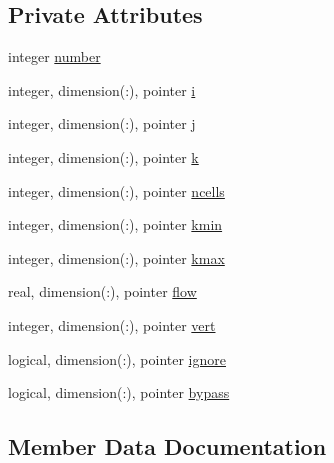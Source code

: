 \subsection*{Private Attributes}
\begin{DoxyCompactItemize}
\item 
integer \mbox{\hyperlink{structmodulewaterproperties_1_1t__discharge_ad03e3bce1a8d5d4e84703d5f4dd53099}{number}}
\item 
integer, dimension(\+:), pointer \mbox{\hyperlink{structmodulewaterproperties_1_1t__discharge_ad24351435b5373103bdb95ee28cf5f6f}{i}}
\item 
integer, dimension(\+:), pointer \mbox{\hyperlink{structmodulewaterproperties_1_1t__discharge_a6951669e5824f5cc076e0d2c888ee6c0}{j}}
\item 
integer, dimension(\+:), pointer \mbox{\hyperlink{structmodulewaterproperties_1_1t__discharge_a9787b37b4205c4ba0dcef0cfb6ca2edf}{k}}
\item 
integer, dimension(\+:), pointer \mbox{\hyperlink{structmodulewaterproperties_1_1t__discharge_af737b75c73400b984d6d14d92698d3ea}{ncells}}
\item 
integer, dimension(\+:), pointer \mbox{\hyperlink{structmodulewaterproperties_1_1t__discharge_a52e3b238d42fac672ae7679ecefd3f3b}{kmin}}
\item 
integer, dimension(\+:), pointer \mbox{\hyperlink{structmodulewaterproperties_1_1t__discharge_a360f11d232420259d7253055f348cdba}{kmax}}
\item 
real, dimension(\+:), pointer \mbox{\hyperlink{structmodulewaterproperties_1_1t__discharge_aa61dc41c65167b5334580e55f98f8472}{flow}}
\item 
integer, dimension(\+:), pointer \mbox{\hyperlink{structmodulewaterproperties_1_1t__discharge_a5211d8fa2169a74e2289fc8eac0519e2}{vert}}
\item 
logical, dimension(\+:), pointer \mbox{\hyperlink{structmodulewaterproperties_1_1t__discharge_a5f22a5e64edc124c0994970a51f59ca4}{ignore}}
\item 
logical, dimension(\+:), pointer \mbox{\hyperlink{structmodulewaterproperties_1_1t__discharge_af715f3d9f248fd15c9bc31558871d6ec}{bypass}}
\end{DoxyCompactItemize}


\subsection{Member Data Documentation}
\mbox{\label{structmodulewaterproperties_1_1t__discharge_af715f3d9f248fd15c9bc31558871d6ec}} 
